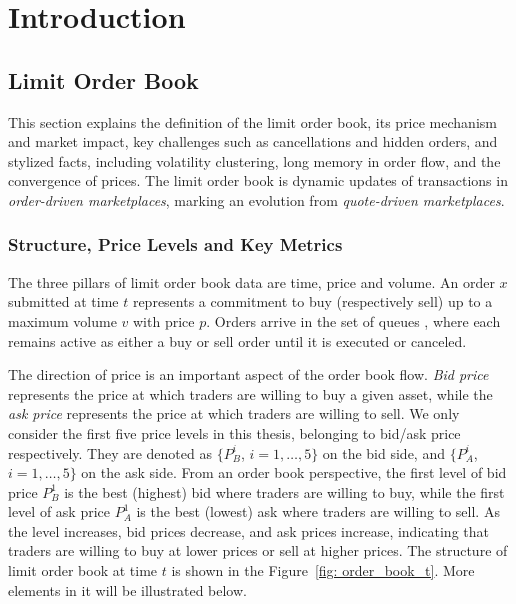 \chapter{Introduction}\label{chapter:introduction}

\section{Limit Order Book}
This section explains the definition of the limit order book, its price mechanism and market impact, key challenges such as cancellations and hidden orders, and stylized facts, including volatility clustering, long memory in order flow, and the convergence of prices. The limit order book is dynamic updates of transactions in \textit{order-driven marketplaces}, marking an evolution from \textit{quote-driven marketplaces}.

\subsection{Structure, Price Levels and Key Metrics}
The three pillars of limit order book data are time, price and volume. An order $x$ submitted at time $t$ represents a commitment to buy (respectively sell) up to a maximum volume $v$ with price $p$. Orders arrive in the set of queues \citep{gould2013limitorderbooks}, where each remains active as either a buy or sell order until it is executed or canceled. 

The direction of price is an important aspect of the order book flow. \textit{Bid price} represents the price at which traders are willing to buy a given asset, while the \textit{ask price} represents the price at which traders are willing to sell. We only consider the first five price levels in this thesis, belonging to bid/ask price respectively. They are denoted as $\{P_B ^ {i}$, $i = 1, \dots, 5\}$ on the bid side, and $\{P_A ^ {i}$, $i = 1, \dots, 5\}$ on the ask side. From an order book perspective, the first level of bid price $P_B^1$ is the best (highest) bid where traders are willing to buy, while the first level of ask price $P_A^1$ is the best (lowest) ask where traders are willing to sell. As the level increases, bid prices decrease, and ask prices increase, indicating that traders are willing to buy at lower prices or sell at higher prices. The structure of limit order book at time $t$ is shown in the Figure~\ref{fig: order_book_t}. More elements in it will be illustrated below.

